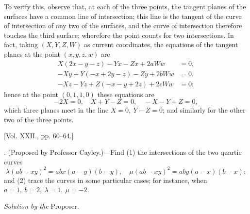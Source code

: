 \documentclass[10pt,twoside]{article}
\begin{document}
To verify this, observe that, at each of the three points, the tangent planes of the surfaces have a common line of intersection; this line is the tangent of the curve of intersection of any two of the surfaces, and the curve of intersection therefore touches the third surface; wherefore the point counts for two intersections. In fact, taking \((X,Y,Z,W)\) as current coordinates, the equations of the tangent planes at the point \((x,y,z,w)\) are
\[
\begin{aligned}
X(2x-y-z)-Yx-Zx+2aWw&=0,\\
-Xy+Y(-x+2y-z)-Zy+2bWw&=0,\\
-Xz-Yz+Z(-x-y+2z)+2cWw&=0:
\end{aligned}
\]
hence at the point \((0,1,1,0)\) these equations are
\[
-2X=0,\quad X+Y-Z=0,\quad -X-Y+Z=0,
\]
which three planes meet in the line \(X=0,\ Y-Z=0\); and similarly for the other two of the three points.

\bigskip
\begin{center}
[Vol. XXII., pp. 60--64.]
\end{center}

. (Proposed by Professor Cayley.)---Find (1) the intersections of the two quartic curves
\[
\lambda(ab-xy)^2=abx(a-y)(b-y),\quad
\mu(ab-xy)^2=aby(a-x)(b-x);
\]
\newpage
\noindent and (2) trace the curves in some particular cases; for instance, when \(a=1,\ b=2,\ \lambda=1,\ \mu=-2\).

\bigskip
\begin{center}
\textit{Solution by the} Proposer.
\end{center}
\end{document}
